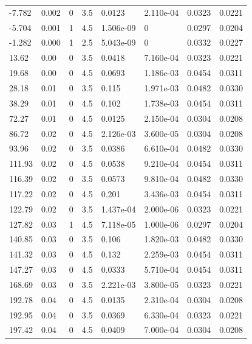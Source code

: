 \documentclass[preview]{standalone}
\begin{document}
{{\begin{tabular}{L{1.2cm}C{1.2cm} C{0.3cm}C{0.5cm} C{1.4cm}C{1.4cm} C{1.4cm}C{1.4cm}}
  -7.782  &  0.002  & 0     & 3.5 &  0.0123  & 2.110e-04  & 0.0323 &  0.0221   \\ 
  -5.704  &  0.001  & 1     & 4.5 &  1.506e-09  & 0  & 0.0297 &  0.0204   \\ 
  -1.282  &  0.000  & 1     & 2.5 &  5.043e-09  & 0  & 0.0332 &  0.0227   \\ 
  13.62  &  0.00  & 0     & 3.5 &  0.0418  & 7.160e-04  & 0.0323 &  0.0221   \\ 
  19.68  &  0.00  & 0     & 4.5 &  0.0693  & 1.186e-03  & 0.0454 &  0.0311   \\ 
  28.18  &  0.01  & 0     & 3.5 &  0.115  & 1.971e-03  & 0.0482 &  0.0330   \\ 
  38.29  &  0.01  & 0     & 4.5 &  0.102  & 1.738e-03  & 0.0454 &  0.0311   \\ 
  72.27  &  0.01  & 0     & 4.5 &  0.0125  & 2.150e-04  & 0.0304 &  0.0208   \\ 
  86.72  &  0.02  & 0     & 4.5 &  2.126e-03  & 3.600e-05  & 0.0304 &  0.0208   \\ 
  93.96  &  0.02  & 0     & 3.5 &  0.0386  & 6.610e-04  & 0.0482 &  0.0330   \\ 
  111.93  &  0.02  & 0     & 4.5 &  0.0538  & 9.210e-04  & 0.0454 &  0.0311   \\ 
  116.39  &  0.02  & 0     & 3.5 &  0.0573  & 9.810e-04  & 0.0482 &  0.0330   \\ 
  117.22  &  0.02  & 0     & 4.5 &  0.201  & 3.436e-03  & 0.0454 &  0.0311   \\ 
  122.79  &  0.02  & 0     & 3.5 &  1.437e-04  & 2.000e-06  & 0.0323 &  0.0221   \\ 
  127.82  &  0.03  & 1     & 4.5 &  7.118e-05  & 1.000e-06  & 0.0297 &  0.0204   \\ 
  140.85  &  0.03  & 0     & 3.5 &  0.106  & 1.820e-03  & 0.0482 &  0.0330   \\ 
  141.32  &  0.03  & 0     & 4.5 &  0.132  & 2.259e-03  & 0.0454 &  0.0311   \\ 
  147.27  &  0.03  & 0     & 4.5 &  0.0333  & 5.710e-04  & 0.0454 &  0.0311   \\ 
  168.69  &  0.03  & 0     & 3.5 &  2.221e-03  & 3.800e-05  & 0.0323 &  0.0221   \\ 
  192.78  &  0.04  & 0     & 4.5 &  0.0135  & 2.310e-04  & 0.0304 &  0.0208   \\ 
  192.95  &  0.04  & 0     & 3.5 &  0.0369  & 6.330e-04  & 0.0323 &  0.0221   \\ 
  197.42  &  0.04  & 0     & 4.5 &  0.0409  & 7.000e-04  & 0.0304 &  0.0208   \\ 

\end{tabular}}}
\end{document}
